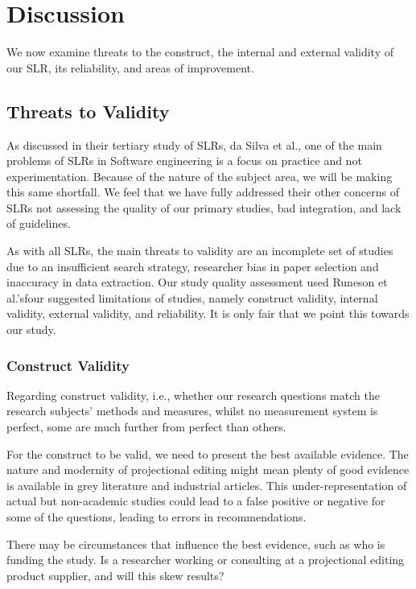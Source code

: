 \section{Discussion}
\label{section:slr_discussion}

We now examine threats to the construct, the internal and external validity of our SLR, its reliability, and areas of improvement.

 
\subsection{Threats to Validity}  
As discussed in their tertiary study of SLRs, da Silva et al.\cite{DaSilvaFabioQ.B2011Syos}, one of the main problems of SLRs in Software engineering is a focus on practice and not experimentation.
Because of the nature of the subject area, we will be making this same shortfall. 
We feel that we have fully addressed their other concerns of SLRs not assessing the quality of our primary studies, bad integration, and lack of guidelines.

As with all SLRs, the main threats to validity are an incomplete set of studies due to an insufficient search strategy, researcher bias in paper selection and inaccuracy in data extraction.
Our study quality assessment used Runeson et al.'s\cite{runeson2009guidelines}four suggested limitations of studies, namely construct validity, internal validity, external validity, and reliability.
It is only fair that we point this towards our study.

\subsubsection{Construct Validity}
Regarding construct validity, i.e., whether our research questions match the research subjects' methods and measures, whilst no measurement system is perfect, some are much further from perfect than others.

For the construct to be valid, we need to present the best available evidence.
The nature and modernity of projectional editing might mean plenty of good evidence is available in grey literature and industrial articles. 
This under-representation of actual but non-academic studies could lead to a false positive or negative for some of the questions, leading to errors in recommendations.

There may be circumstances that influence the best evidence, such as who is funding the study. 
Is a researcher working or consulting at a projectional editing product supplier, and will this skew results?

